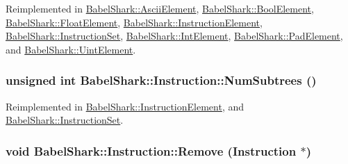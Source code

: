 Reimplemented in \hyperlink{class_babel_shark_1_1_ascii_element_452958c460980a70b80d02b659c11057}{BabelShark::AsciiElement}, \hyperlink{class_babel_shark_1_1_bool_element_5eac4fa70d0dcf64414000285324d476}{BabelShark::BoolElement}, \hyperlink{class_babel_shark_1_1_float_element_8431ada746a028580cccdadc83538793}{BabelShark::FloatElement}, \hyperlink{class_babel_shark_1_1_instruction_element_7795ad0b2acedb5a2b68d2c3e63351ae}{BabelShark::InstructionElement}, \hyperlink{class_babel_shark_1_1_instruction_set_4d4c66b375e0f15de7775b295e15b558}{BabelShark::InstructionSet}, \hyperlink{class_babel_shark_1_1_int_element_d8467ad7b321f4189f944833ee60990f}{BabelShark::IntElement}, \hyperlink{class_babel_shark_1_1_pad_element_06d4d9d5aca06773f994b794114bb093}{BabelShark::PadElement}, and \hyperlink{class_babel_shark_1_1_uint_element_61c83ce006915d71961667032f77b6db}{BabelShark::UintElement}.\hypertarget{class_babel_shark_1_1_instruction_da0c4af8c73c7aae8b8d3a32a09f11e4}{
\subsubsection[{NumSubtrees}]{\setlength{\rightskip}{0pt plus 5cm}unsigned int BabelShark::Instruction::NumSubtrees ()}}
\label{class_babel_shark_1_1_instruction_da0c4af8c73c7aae8b8d3a32a09f11e4}




Reimplemented in \hyperlink{class_babel_shark_1_1_instruction_element_a99dae4733a6937c0d7f0232526b8db5}{BabelShark::InstructionElement}, and \hyperlink{class_babel_shark_1_1_instruction_set_663c141979af83f6b7e5188d0d105fad}{BabelShark::InstructionSet}.\hypertarget{class_babel_shark_1_1_instruction_74d0712f8c94ea4e32b3cb202d9bd06d}{
\subsubsection[{Remove}]{\setlength{\rightskip}{0pt plus 5cm}void BabelShark::Instruction::Remove ({\bf Instruction} $\ast$)}}
\label{class_babel_shark_1_1_instruction_74d0712f8c94ea4e32b3cb202d9bd06d}


